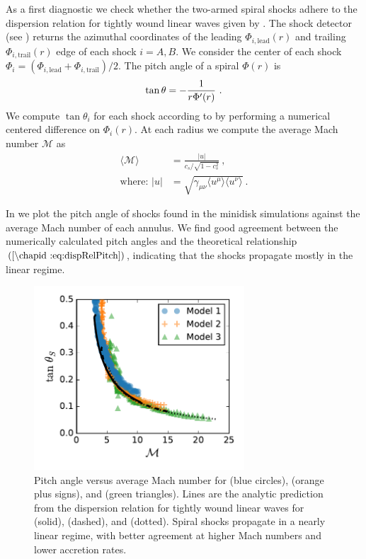 As a first diagnostic we check whether the two-armed spiral shocks adhere to the dispersion relation for tightly wound linear waves given by .  The shock detector (see ) returns the azimuthal coordinates of the leading $\Phi_{i,\text{lead}}(r)$ and trailing $\Phi_{i,\text{trail}}(r)$ edge of each shock $i=A,B$.  We consider the center of each shock $\Phi_i = (\Phi_{i,\text{lead}} + \Phi_{i,\text{trail}}) / 2$.  The pitch angle of a spiral $\Phi(r)$ is
\begin{equation}
	\tan \theta = -\frac{1}{r \Phi'(r)} \ . \eqlabel{deftanp} 
\end{equation}
We compute $\tan \theta_i$ for each shock according to  by performing a numerical centered difference on $\Phi_i(r)$.  At each radius we compute the average Mach number $\mathcal{M}$ as
\begin{align}
	\langle \mathcal{M} \rangle &=  \frac{|u|}{c_s / \sqrt{1-c_s^2}} \ , \\
	\text{where: } |u| &= \sqrt{\gamma_{\mu\nu} \langle u^\mu \rangle  \langle u^\nu \rangle} \nonumber \ .
\end{align}

In  we plot the pitch angle of shocks found in the minidisk simulations against the average Mach number of each annulus. We find good agreement between the numerically calculated pitch angles and the theoretical relationship $\eqrefp{dispRelPitch}$, indicating that the shocks propagate mostly in the linear regime.

\begin{figure}
\begin{center}
\includegraphics[width=0.7\textwidth]{figures/minidisk/q011_all_tanq_mach.pdf}
\end{center}
\caption{ Pitch angle versus average Mach number for  (blue circles),  (orange plus signs), and  (green triangles). Lines are the analytic prediction from the dispersion relation for tightly wound linear waves for  (solid),  (dashed), and  (dotted).  Spiral shocks propagate in a nearly linear regime, with better agreement at higher Mach numbers and lower accretion rates.}
\end{figure}


